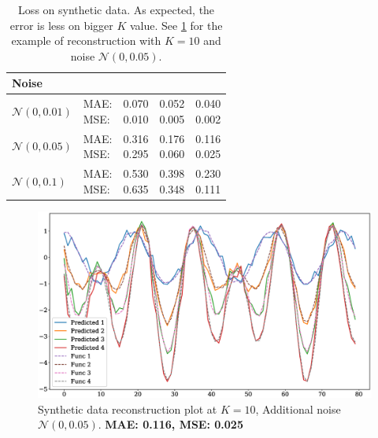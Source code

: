 \documentclass[12pt]{article}
\begin{document}
{\begin{table}[!h]
\def\arraystretch{2.3}
\begin{center}
\caption{Loss on synthetic data. As expected, the error is less on bigger $K$ value. See \ref{fig:fig5} for the example of reconstruction with $K=10$ and noise $\mathcal{N}(0, 0.05)$.}
\begin{tabular}{|l||l||*{3}{c|}}\hline
	{Noise}
	&\makebox[3em]{Metric}&\makebox[3em]{$K=2$}&\makebox[3em]{$K=4$}&\makebox[3em]{$K=10$}\\\hline
	$\mathcal{N}(0, 0.01)$&\makecell{ MAE: \\ MSE: } &\makecell{ 0.070 \\ 0.010 }&\makecell{ 0.052 \\ 0.005 }&\makecell{ 0.040 \\ 0.002 }\\\hline
	$\mathcal{N}(0, 0.05)$&\makecell{ MAE: \\ MSE: } &\makecell{ 0.316 \\ 0.295 }&\makecell{ 0.176 \\ 0.060 }&\makecell{ 0.116 \\ 0.025 }\\\hline
	$\mathcal{N}(0, 0.1)$& \makecell{ MAE: \\ MSE: } &\makecell{ 0.530 \\ 0.635 }&\makecell{ 0.398 \\ 0.348 }&\makecell{ 0.230 \\ 0.111 }\\\hline
\end{tabular}
\end{center}
\end{table}


\begin{figure}[!htbp]
	\centering
	\includegraphics[width=\textwidth]{synthetic_time_series_K10N005.eps}
	\caption{Synthetic data reconstruction plot at $K=10$, Additional noise $\mathcal{N}(0, 0.05)$. \textbf{MAE: 0.116, MSE: 0.025}}
	\label{fig:fig5}
\end{figure}

}
\end{document}
